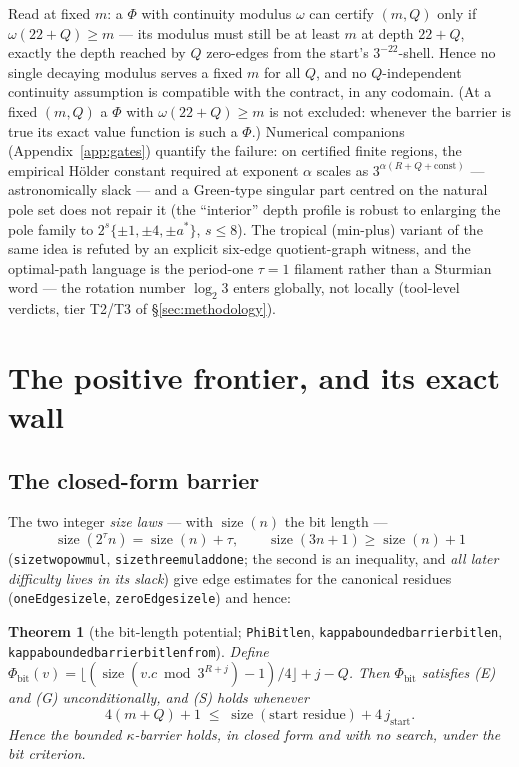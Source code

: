 \documentclass[11pt]{amsart}
\newtheorem{theorem}{Theorem}[section]
\theoremstyle{definition}
\theoremstyle{remark}
\newcommand{\size}{\operatorname{size}}
\newcommand{\lean}[1]{{\def\_{\textunderscore\allowbreak}\texttt{#1}}}
\begin{document}
Read at fixed $m$: a $\Phi$ with continuity modulus $\omega$ can certify
$(m,Q)$ only if $\omega(22+Q) \ge m$ --- its modulus must still be at least
$m$ at depth $22+Q$, exactly the depth reached by $Q$ zero-edges from the
start's $3^{-22}$-shell.  Hence no single decaying modulus serves a fixed $m$
for all $Q$, and no $Q$-independent continuity assumption is compatible with
the contract, in any codomain.  (At a fixed $(m,Q)$ a $\Phi$ with
$\omega(22+Q) \ge m$ is not excluded: whenever the barrier is true its exact
value function is such a $\Phi$.)  Numerical companions
(Appendix~\ref{app:gates}) quantify the
failure: on certified finite regions, the empirical Hölder constant required
at exponent $\alpha$ scales as $3^{\alpha(R+Q+\mathrm{const})}$ ---
astronomically slack --- and a Green-type singular part centred on the
natural pole set does not repair it (the ``interior'' depth profile is
robust to enlarging the pole family to
$2^{s}\{\pm1, \pm4, \pm a^{*}\}$, $s \le 8$).  The tropical (min-plus)
variant of the same idea is refuted by an explicit six-edge quotient-graph
witness, and the optimal-path language is the period-one $\tau{=}1$
filament rather than a Sturmian word --- the rotation number $\log_2 3$
enters globally, not locally (tool-level verdicts, tier T2/T3 of
\S\ref{sec:methodology}).

\section{The positive frontier, and its exact wall}\label{sec:positive}

\subsection{The closed-form barrier}
The two integer \emph{size laws} --- with $\size(n)$ the bit length ---
\[
\size(2^{\tau}n) = \size(n) + \tau, \qquad
\size(3n+1) \ge \size(n) + 1
\]
(\lean{size\_two\_pow\_mul}, \lean{size\_three\_mul\_add\_one}; the second is
an inequality, and \emph{all later difficulty lives in its slack}) give edge
estimates for the canonical residues (\lean{oneEdge\_size\_le},
\lean{zeroEdge\_size\_le}) and hence:

\begin{theorem}[the bit-length potential;
\lean{PhiBitlen}, \lean{kappa\_bounded\_barrier\_bitlen},
\lean{kappa\_bounded\_barrier\_bitlen\_from}]\label{thm:phibitlen}
Define $\Phi_{\mathrm{bit}}(v) = \lfloor (\size(v.c \bmod 3^{R+j}) - 1)/4
\rfloor + j - Q$.  Then $\Phi_{\mathrm{bit}}$ satisfies (E) and (G)
unconditionally, and (S) holds whenever
\[
4(m + Q) + 1 \;\le\; \size(\text{start residue}) + 4\,j_{\text{start}}.
\]
Hence the bounded $\kappa$-barrier holds, in closed form and with no search,
under the bit criterion.
\end{theorem}
\end{document}
